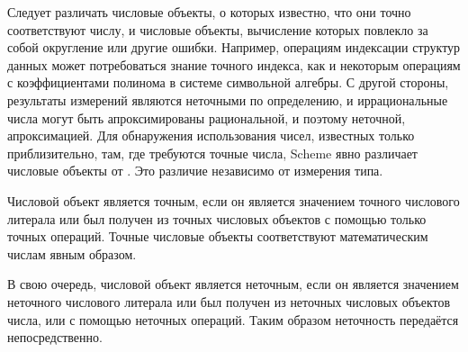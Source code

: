 Следует различать числовые объекты, о которых известно, что они точно
соответствуют числу, и числовые объекты, вычисление которых повлекло за собой округление или
другие ошибки. Например, операциям индексации структур данных может потребоваться знание точного
индекса, как и некоторым операциям с коэффициентами полинома в системе символьной алгебры. С
другой стороны, результаты измерений являются неточными по определению, и иррациональные
числа могут быть апроксимированы рациональной, и поэтому неточной, апроксимацией. Для обнаружения
использования чисел, известных только приблизительно, там, где требуются точные числа,
Scheme явно различает  числовые объекты от . Это
различие независимо от измерения типа.

Числовой объект является точным, если он является значением точного числового литерала или был
получен из точных числовых объектов с помощью только точных операций. Точные числовые объекты
соответствуют математическим числам явным образом.

В свою очередь, числовой объект является неточным, если он является значением неточного
числового литерала или был получен из неточных числовых объектов числа, или с помощью неточных
операций. Таким образом неточность передаётся непосредственно.

